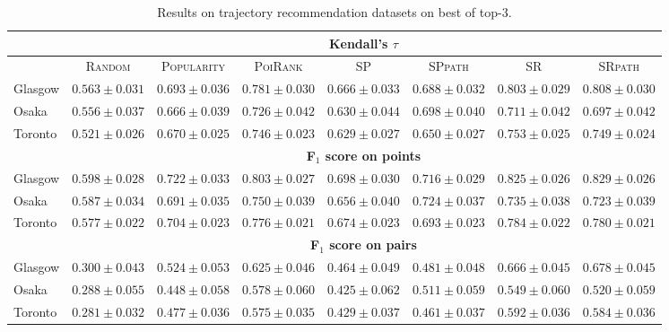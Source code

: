 \begin{table*}[!h]
\caption{Results on trajectory recommendation datasets on best of top-3.}
\centering
\scriptsize
\setlength{\tabcolsep}{3pt} %
\begin{tabular}{l|cc|cc|ccc} \hline
& \multicolumn{7}{c}{\bf Kendall's $\tau$} \\ \hline
 & \textsc{Random} & \textsc{Popularity} & \textsc{PoiRank} & \textsc{SP} & \textsc{SPpath} & \textsc{SR} & \textsc{SRpath} \\ \hline
Glasgow & $0.563\pm0.031$ & $0.693\pm0.036$ & $0.781\pm0.030$ & $0.666\pm0.033$ & $0.688\pm0.032$ & $\mathit{0.803\pm0.029}$ & $\mathbf{0.808\pm0.030}$ \\
Osaka & $0.556\pm0.037$ & $0.666\pm0.039$ & $\mathbf{0.726\pm0.042}$ & $0.630\pm0.044$ & $0.698\pm0.040$ & $\mathit{0.711\pm0.042}$ & $0.697\pm0.042$ \\
Toronto & $0.521\pm0.026$ & $0.670\pm0.025$ & $0.746\pm0.023$ & $0.629\pm0.027$ & $0.650\pm0.027$ & $\mathbf{0.753\pm0.025}$ & $\mathit{0.749\pm0.024}$ \\
\hline
& \multicolumn{7}{c}{\bf F$_1$ score on points} \\ \hline
Glasgow & $0.598\pm0.028$ & $0.722\pm0.033$ & $0.803\pm0.027$ & $0.698\pm0.030$ & $0.716\pm0.029$ & $\mathit{0.825\pm0.026}$ & $\mathbf{0.829\pm0.026}$ \\
Osaka & $0.587\pm0.034$ & $0.691\pm0.035$ & $\mathbf{0.750\pm0.039}$ & $0.656\pm0.040$ & $0.724\pm0.037$ & $\mathit{0.735\pm0.038}$ & $0.723\pm0.039$ \\
Toronto & $0.577\pm0.022$ & $0.704\pm0.023$ & $0.776\pm0.021$ & $0.674\pm0.023$ & $0.693\pm0.023$ & $\mathbf{0.784\pm0.022}$ & $\mathit{0.780\pm0.021}$ \\
\hline
& \multicolumn{7}{c}{\bf F$_1$ score on pairs} \\ \hline
Glasgow & $0.300\pm0.043$ & $0.524\pm0.053$ & $0.625\pm0.046$ & $0.464\pm0.049$ & $0.481\pm0.048$ & $\mathit{0.666\pm0.045}$ & $\mathbf{0.678\pm0.045}$ \\
Osaka & $0.288\pm0.055$ & $0.448\pm0.058$ & $\mathbf{0.578\pm0.060}$ & $0.425\pm0.062$ & $0.511\pm0.059$ & $\mathit{0.549\pm0.060}$ & $0.520\pm0.059$ \\
Toronto & $0.281\pm0.032$ & $0.477\pm0.036$ & $0.575\pm0.035$ & $0.429\pm0.037$ & $0.461\pm0.037$ & $\mathbf{0.592\pm0.036}$ & $\mathit{0.584\pm0.036}$ \\
\hline
\end{tabular}
\end{table*}


